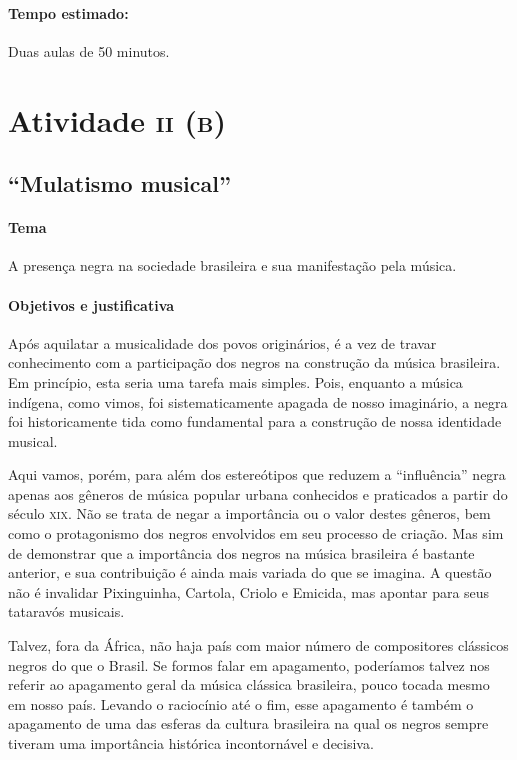 \documentclass[11pt]{extarticle}
\begin{document}
\paragraph{Tempo estimado:} Duas aulas de 50 minutos.


\section{Atividade \textsc{ii (b)}}
\subsection{“Mulatismo musical”}

\paragraph{Tema} A presença negra na sociedade brasileira e sua manifestação pela música.



\paragraph{Objetivos e justificativa}

Após aquilatar a musicalidade dos povos originários, é a vez de travar
conhecimento com a participação dos negros na construção da música brasileira.
Em princípio, esta seria uma tarefa mais simples. Pois, enquanto a música
indígena, como vimos, foi sistematicamente apagada de nosso imaginário, a negra
foi historicamente tida como fundamental para a construção de nossa identidade
musical.

Aqui vamos, porém, para além dos estereótipos que reduzem a “influência” negra
apenas aos gêneros de música popular urbana conhecidos e praticados a partir do
século \textsc{xix}. Não se trata de negar a importância ou o valor destes gêneros, bem
como o protagonismo dos negros envolvidos em seu processo de criação. Mas sim
de demonstrar que a importância dos negros na música brasileira é bastante
anterior, e sua contribuição é ainda mais variada do que se imagina. A questão
não é invalidar Pixinguinha, Cartola, Criolo e Emicida, mas apontar para seus
tataravós musicais.


Talvez, fora da África, não haja país com maior número de compositores
clássicos negros do que o Brasil. Se formos falar em apagamento, poderíamos
talvez nos referir ao apagamento geral da música clássica brasileira, pouco
tocada mesmo em nosso país. Levando o raciocínio até o fim, esse apagamento é
também o apagamento de uma das esferas da cultura brasileira na qual os negros
sempre tiveram uma importância histórica incontornável e decisiva.
\end{document}
